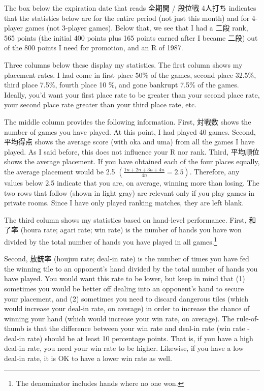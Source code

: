 \bigskip

The box below the expiration date that reads 全期間 / 段位戦 4人打ち indicates that the statistics below are for the entire period (not just this month) and for 4-player games (not 3-player games). Below that, we see that I had a 二段 rank, 565 points (the initial 400 points plus 165 points earned after I became 二段) out of the 800 points I need for promotion, and an R of 1987. 

\bigskip

Three columns below these display my statistics. The first column shows my placement rates. I had come in first place 50\% of the games, second place 32.5\%, third place 7.5\%, fourth place 10 \%, and gone bankrupt 7.5\% of the games. Ideally, you'd want your first place rate to be greater than your second place rate, your second place rate greater than your third place rate, etc. 

\bigskip

The middle column provides the following information. First, 対戦数 shows the number of games you have played. At this point, I had played 40 games. Second, 平均得点 shows the average score (with {\jap oka} and {\jap uma}) from all the games I have played. As I said before, this does not influence your R nor rank. Third, 平均順位 shows the average placement. If you have obtained each of the four places equally, the average placement would be 2.5 $\left( \frac{1  n + 2  n + 3  n + 4 n}{4n} = 2.5 \right)$. Therefore, any values below 2.5 indicate that you are, on average, winning more than losing. 
The two rows that follow (shown in light gray) are relevant only if you play games in private rooms. Since I have only played ranking matches, they are left blank. 

\bigskip

The third column shows my statistics based on hand-level performance. First, 和了率 ({\jap houra} rate; {\jap agari} rate; win rate) is the number of hands you have won divided by the total number of hands you have played in all games.\footnote{The denominator includes hands where no one won.} 

\bigskip
Second, 放銃率 ({\jap houjuu} rate; deal-in rate) is the number of times you have fed the winning tile to an opponent's hand divided by the total number of hands you have played. You would want this rate to be lower, but keep in mind that (1) sometimes you would be better off dealing into an opponent's hand to secure your placement, and (2) sometimes you need to discard dangerous tiles (which would increase your deal-in rate, on average) in order to increase the chance of winning your hand (which would increase your win rate, on average). The rule-of-thumb is that the difference between your win rate and deal-in rate (win rate - deal-in rate) should be at least 10 percentage points. That is, if you have a high deal-in rate, you need your win rate to be higher. Likewise, if you have a low deal-in rate, it is OK to have a lower win rate as well. 

